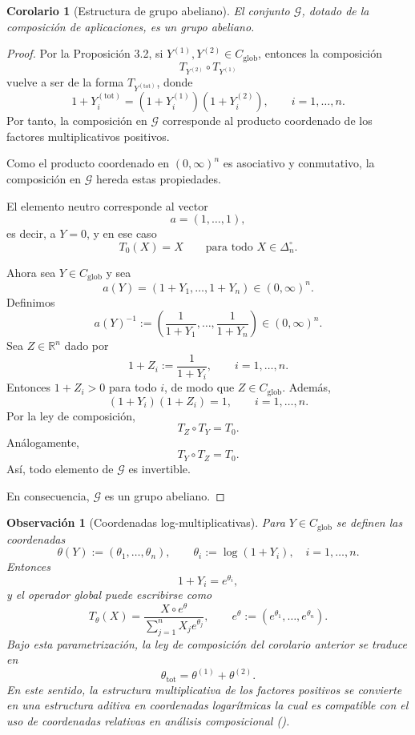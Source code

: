 ﻿\documentclass[12pt]{article}
\newtheorem{corolario}{Corolario}[section]
\newtheorem{observacion}{Observación}[section]
\begin{document}
\begin{corolario}[Estructura de grupo abeliano]
El conjunto $\mathcal G$, dotado de la composición de aplicaciones, es un grupo abeliano.
\end{corolario}

\begin{proof}
Por la Proposición 3.2, si $Y^{(1)},Y^{(2)}\in C_{\mathrm{glob}}$, entonces la composición
\[
T_{Y^{(2)}}\circ T_{Y^{(1)}}
\]
vuelve a ser de la forma $T_{Y^{(\mathrm{tot})}}$, donde
\[
1+Y_i^{(\mathrm{tot})}=(1+Y_i^{(1)})(1+Y_i^{(2)}),
\qquad i=1,\dots,n.
\]
Por tanto, la composición en $\mathcal G$ corresponde al producto coordenado de los factores multiplicativos positivos.

Como el producto coordenado en $(0,\infty)^n$ es asociativo y conmutativo, la composición en $\mathcal G$ hereda estas propiedades.

El elemento neutro corresponde al vector
\[
a=(1,\dots,1),
\]
es decir, a $Y=0$, y en ese caso
\[
T_0(X)=X
\qquad \text{para todo } X\in\Delta_n^\circ.
\]

Ahora sea $Y\in C_{\mathrm{glob}}$ y sea
\[
a(Y)=(1+Y_1,\dots,1+Y_n)\in(0,\infty)^n.
\]
Definimos
\[
a(Y)^{-1}
:=
\left(
\frac{1}{1+Y_1},\dots,\frac{1}{1+Y_n}
\right)\in(0,\infty)^n.
\]
Sea $Z\in\mathbb R^n$ dado por
\[
1+Z_i:=\frac{1}{1+Y_i},
\qquad i=1,\dots,n.
\]
Entonces $1+Z_i>0$ para todo $i$, de modo que $Z\in C_{\mathrm{glob}}$. Además,
\[
(1+Y_i)(1+Z_i)=1,
\qquad i=1,\dots,n.
\]
Por la ley de composición,
\[
T_Z\circ T_Y=T_0.
\]
Análogamente,
\[
T_Y\circ T_Z=T_0.
\]
Así, todo elemento de $\mathcal G$ es invertible.

En consecuencia, $\mathcal G$ es un grupo abeliano.
\end{proof}

\begin{observacion}[Coordenadas log-multiplicativas]\label{obs:coordenadasLog}
Para $Y\in C_{\mathrm{glob}}$ se definen las coordenadas
\[
\theta(Y) := (\theta_1,\dots,\theta_n), \qquad \theta_i := \log(1+Y_i), \quad i=1,\dots,n.
\]
Entonces
\[
1+Y_i=e^{\theta_i},
\]
y el operador global puede escribirse como
\[
T_\theta(X)
=
\frac{X\circ e^\theta}{\sum_{j=1}^n X_j e^{\theta_j}},
\qquad
e^\theta:=(e^{\theta_1},\dots,e^{\theta_n}).
\]
Bajo esta parametrización, la ley de composición del corolario anterior se traduce en
\[
\theta_{\mathrm{tot}}=\theta^{(1)}+\theta^{(2)}.
\]
En este sentido, la estructura multiplicativa de los factores positivos se convierte en una estructura aditiva en coordenadas logarítmicas la cual es compatible con el uso de coordenadas relativas en análisis composicional (\cite{Aitchison1986}).
\end{observacion}
\end{document}
